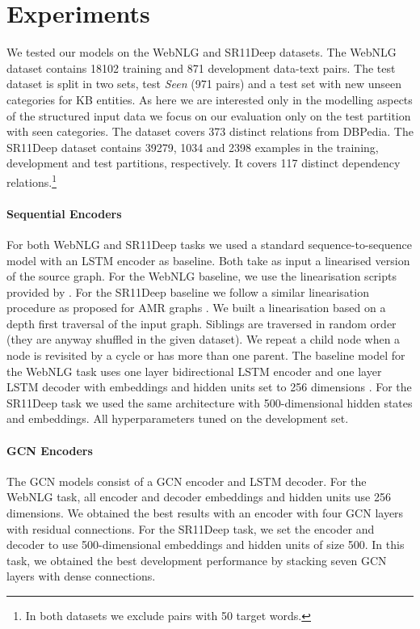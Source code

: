 \documentclass[11pt,a4paper,dvipsnames]{article}
\begin{document}
\section{Experiments}
\label{sec:evalsetup}

We tested our models on the WebNLG and SR11Deep datasets.
The WebNLG dataset contains 18102 training and 871 development 
data-text pairs. 
The test dataset is split in two sets, test \textit{Seen} (971 pairs)
and a test set with new unseen categories for KB entities.
As here we are interested only in the modelling aspects of the 
structured input data we focus on our evaluation only on the 
test partition with seen categories.
The dataset covers 373 distinct relations from DBPedia. 
The SR11Deep dataset contains 39279, 1034 and 2398 examples in 
the training, development and test partitions, respectively.
It covers 117 distinct dependency relations.\footnote{
In both datasets we exclude pairs with 50 target words.}

\paragraph{Sequential Encoders}
For both WebNLG and SR11Deep tasks we used a standard sequence-to-sequence model \cite{bahdanau2015neural,luong2015effective} with an LSTM encoder as baseline.
Both take as input a linearised version of the source graph.
For the WebNLG baseline, we use the linearisation scripts provided by 
\cite{gardent-EtAl:2017:INLG2017}. 
For the SR11Deep baseline we follow a similar linearisation procedure
as proposed for AMR graphs \cite{konstas2017neural}.
We built a linearisation based on a depth first traversal of the input graph. 
Siblings are traversed in random order (they are anyway shuffled in the given 
dataset). 
We repeat a child node when a node is revisited by a cycle
or has more than one parent.
The baseline model for the WebNLG task uses one layer bidirectional LSTM encoder and one layer LSTM decoder with embeddings and hidden units set to 256 dimensions . 
For the SR11Deep task we used the same architecture with 500-dimensional hidden states and embeddings.
All hyperparameters tuned on the development set.
 

\paragraph{GCN Encoders}
The GCN models consist of a GCN encoder and LSTM decoder.
For the WebNLG task, all encoder and decoder embeddings and hidden units
use 256 dimensions. 
We obtained the best results with an encoder with four GCN layers with residual connections.
For the SR11Deep task, we set the encoder and decoder to use 500-dimensional 
embeddings and hidden units of size 500. In this task, we obtained 
the best development performance by stacking seven GCN layers with dense connections.
\end{document}
